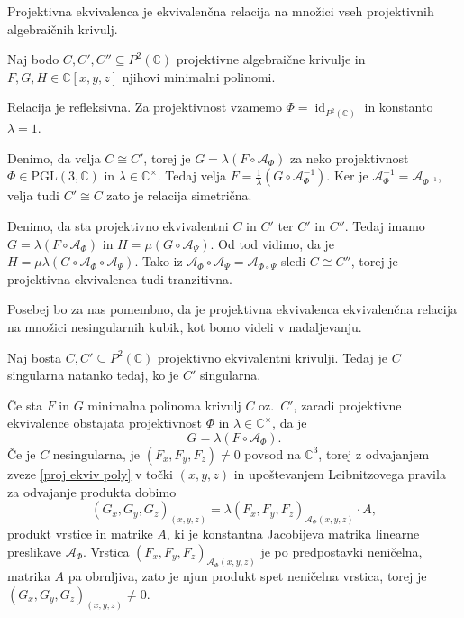 \documentclass[mat1]{fmfdelo}
\newcommand{\C}{\mathbb C}
\newcommand{\CM}{\mathbb C ^\times}
\newcommand{\PC}{P^2(\mathbb C)}
\newcommand{\Cxyz}{\C[x,y,z]}
\newcommand{\inv}{^{-1}}
\DeclareMathOperator{\id}{id}
\theoremstyle{definition}
\begin{document}
\begin{trditev}
    Projektivna ekvivalenca je ekvivalenčna relacija na množici vseh projektivnih algebraičnih krivulj.
\end{trditev}

\begin{dokaz}
    Naj bodo $C, C', C'' \subseteq \PC$ projektivne algebraične krivulje in $F, G, H \in \Cxyz$ njihovi minimalni polinomi. 
    \par Relacija je refleksivna. Za projektivnost vzamemo $\Phi = \id_{\PC}$ in konstanto $\lambda = 1$. 
    \par Denimo, da velja $C \cong C'$, torej je $G = \lambda (F \circ \mathcal{A}_\Phi)$ za neko projektivnost $\Phi \in \operatorname{PGL(3, \C)}$ in $\lambda \in \CM$. Tedaj velja $F = \frac{1}{\lambda} (G \circ \mathcal{A}_\Phi\inv)$. Ker je $\mathcal{A}_\Phi\inv = \mathcal{A}_{\Phi\inv}$, velja tudi $C' \cong C$ zato je relacija simetrična. 
    \par Denimo, da sta projektivno ekvivalentni $C$ in $C'$ ter $C'$ in $C''$. Tedaj imamo $G = \lambda (F \circ \mathcal{A}_\Phi)$ in $H = \mu (G \circ \mathcal{A}_\Psi)$. Od tod vidimo, da je $H = \mu\lambda(G \circ \mathcal{A}_\Phi \circ \mathcal{A}_\Psi)$. Tako iz $\mathcal{A}_\Phi \circ \mathcal{A}_\Psi = \mathcal{A}_{\Phi \circ \Psi}$ sledi $C \cong C''$, torej je projektivna ekvivalenca tudi tranzitivna. 
\end{dokaz}

Posebej bo za nas pomembno, da je projektivna ekvivalenca ekvivalenčna relacija na množici nesingularnih kubik, kot bomo videli v nadaljevanju. 

\begin{trditev}
    Naj bosta $C, C' \subseteq \PC$ projektivno ekvivalentni krivulji. Tedaj je $C$ singularna natanko tedaj, ko je $C'$ singularna. 
\end{trditev}

\begin{dokaz}
    Če sta $F$ in $G$ minimalna polinoma krivulj $C$ oz.\ $C'$, zaradi projektivne ekvivalence obstajata projektivnost $\Phi$ in $\lambda \in \CM$, da je
    \begin{equation}
        \label{proj ekviv poly}
        G = \lambda (F \circ \mathcal{A}_\Phi).
    \end{equation}
    Če je $C$ nesingularna, je $(F_x, F_y, F_z) \neq 0$ povsod na $\C^3$, torej z odvajanjem zveze \ref{proj ekviv poly} v točki $(x,y,z)$ in upoštevanjem Leibnitzovega pravila za odvajanje produkta dobimo
    \[
        (G_x, G_y, G_z)_{(x,y,z)} = \lambda (F_x, F_y, F_z)_{\mathcal{A}_\Phi (x,y,z)} \cdot A,
    \]
    produkt vrstice in matrike $A$, ki je konstantna Jacobijeva matrika linearne preslikave $\mathcal{A}_\Phi$. Vrstica $(F_x, F_y, F_z)_{\mathcal{A}_\Phi (x,y,z)}$ je po predpostavki neničelna, matrika $A$ pa obrnljiva, zato je njun produkt spet neničelna vrstica, torej je $(G_x, G_y, G_z)_{(x,y,z)} \neq 0$. 
\end{dokaz}
\end{document}
